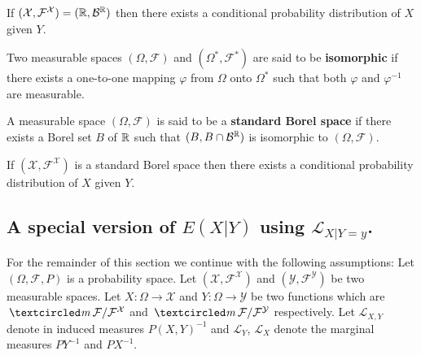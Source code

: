 \begin{theorem}
If $(\mathcal X,\mathcal F^{\mathcal X}) = (\Bbb R, \mathcal B^{\Bbb R})$ then there exists a conditional probability distribution of $X$ given $Y$.
\end{theorem}



\begin{definition}
Two measurable spaces $(\Omega,\mathcal F)$ and $(\Omega^*,\mathcal F^*)$ are said to be {\bf isomorphic} if there exists a one-to-one mapping $\varphi$ from $\Omega$ onto $\Omega^*$ such that both $\varphi$ and $\varphi^{-1}$ are measurable.
\end{definition}


\begin{definition}
A measurable space $(\Omega, \mathcal F)$ is said to be a {\bf standard Borel space} if there exists a Borel set $B$ of $\Bbb R$ such that $(B, B\cap \mathcal B^{\Bbb R})$ is isomorphic to  $(\Omega, \mathcal F)$.
\end{definition}


\begin{theorem}
If $(\mathcal X,\mathcal F^{\mathcal X})$ is a standard Borel space then there exists a conditional probability distribution of $X$ given $Y$.
\end{theorem}






\subsection{A special version of $E(X|Y)$ using $\mathcal L_{X|Y=y}$.}


\begin{sectionassumption}
For the remainder of this section we continue with the following assumptions: Let  $(\Omega, \mathcal F, P)$ is  a probability space. Let $(\mathcal X, \mathcal F^{\mathcal X})$ and $(\mathcal Y, \mathcal F^{\mathcal Y})$ be two measurable spaces. Let $X\colon \Omega \rightarrow\mathcal X$ and $Y\colon \Omega\rightarrow \mathcal Y$ be two functions which are $\mcirc \mathcal F/\mathcal F^{\mathcal X}$ and $\mcirc \mathcal F/\mathcal F^{\mathcal Y}$ respectively. Let $\mathcal L_{X,Y}$ denote in induced measures $P(X,Y)^{-1}$ and $\mathcal L_Y$, $\mathcal L_X$ denote the marginal measures $PY^{-1}$ and $PX^{-1}$.
\end{sectionassumption}


